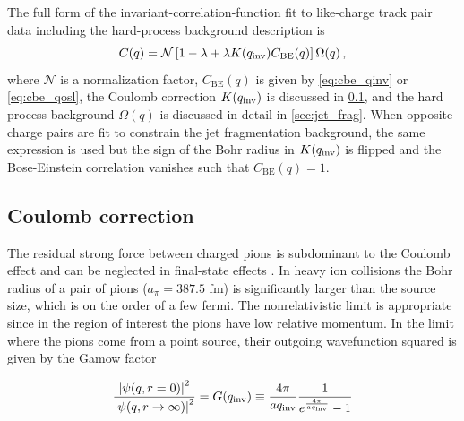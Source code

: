 The full form of the invariant-correlation-function fit to like-charge track pair data including the hard-process background description is
\begin{equation}
C(q) = \mathcal{N} \left[1-\lambda + \lambda K(q_{\mathrm{inv}})C_{\textrm{BE}}(q)\right] \Omega(q) \,,\label{eq:correlation_function_full}
\end{equation}
where $\mathcal{N}$ is a normalization factor, $C_\mathrm{BE}(q)$ is given by \cref{eq:cbe_qinv} or \cref{eq:cbe_qosl}, the Coulomb correction $K(q_{\mathrm{inv}})$ is discussed in \cref{subsec:coulomb}, and the hard process background $\Omega(q)$ is discussed in detail in \cref{sec:jet_frag}.
When opposite-charge pairs are fit to constrain the jet fragmentation background, the same expression is used but the sign of the Bohr radius in $K(q_{\mathrm{inv}})$ is flipped and the Bose-Einstein correlation vanishes such that $C_\mathrm{BE}(q) = 1$.


\subsection{Coulomb correction}
\label{subsec:coulomb}
The residual strong force between charged pions is subdominant to the Coulomb effect and can be neglected in final-state effects \cite{Lednicky:2005tb}.
In heavy ion collisions the Bohr radius of a pair of pions ($a_{\pi} = 387.5 \textrm{ fm}$) is significantly larger than the source size, which is on the order of a few fermi.
The nonrelativistic limit is appropriate since in the region of interest the pions have low relative momentum.
In the limit where the pions come from a point source, their outgoing wavefunction squared is given by the Gamow factor

\begin{equation} \frac{\left| \psi (q, r=0) \right|^2}{\left| \psi (q, r\rightarrow\infty) \right|^2} = G(q_{\mathrm{inv}}) \equiv \frac{4\pi}{a q_{\mathrm{inv}}}\frac{1}{e^{\frac{4\pi}{a q_{\mathrm{inv}}}} - 1} \end{equation}

